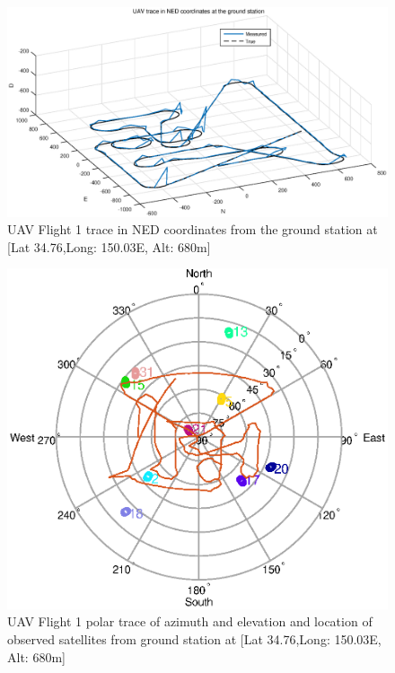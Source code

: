 \documentclass[Space3_Assign2]{subfile}
\begin{document}
\begin{figure}
\centering
\caption{UAV Flight 1 trace in NED coordinates from the ground station at [Lat 34.76\Deg,Long: 150.03\Deg E, Alt: 680m]}
\label{Q1BF1LG}
\includegraphics[width = \linewidth]{./Q1B_F1_LG.eps}
\end{figure}

\begin{figure}
\centering
\caption{UAV Flight 1 polar trace of azimuth and elevation and location of observed satellites from ground station at [Lat 34.76\Deg,Long: 150.03\Deg E, Alt: 680m]}
\label{Q1B_polartrack}
\includegraphics[width = \linewidth]{./Q1B_polartrack.eps}
\end{figure}
\end{document}
